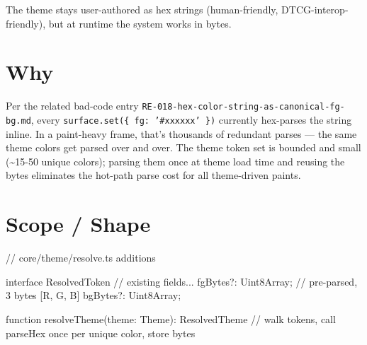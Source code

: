 The theme stays user-authored as hex strings (human-friendly, DTCG-interop-friendly), but at runtime the system works in bytes.

\section{Why}\label{record-369-why}

Per the related bad-code entry \texttt{R\allowbreak{}E\allowbreak{}-\allowbreak{}0\allowbreak{}1\allowbreak{}8\allowbreak{}-\allowbreak{}h\allowbreak{}e\allowbreak{}x\allowbreak{}-\allowbreak{}c\allowbreak{}o\allowbreak{}l\allowbreak{}o\allowbreak{}r\allowbreak{}-\allowbreak{}s\allowbreak{}t\allowbreak{}r\allowbreak{}i\allowbreak{}n\allowbreak{}g\allowbreak{}-\allowbreak{}a\allowbreak{}s\allowbreak{}-\allowbreak{}c\allowbreak{}a\allowbreak{}n\allowbreak{}o\allowbreak{}n\allowbreak{}i\allowbreak{}c\allowbreak{}a\allowbreak{}l\allowbreak{}-\allowbreak{}f\allowbreak{}g\allowbreak{}-\allowbreak{}b\allowbreak{}g\allowbreak{}.\allowbreak{}m\allowbreak{}d}, every \texttt{s\allowbreak{}u\allowbreak{}r\allowbreak{}f\allowbreak{}a\allowbreak{}c\allowbreak{}e\allowbreak{}.\allowbreak{}s\allowbreak{}e\allowbreak{}t\allowbreak{}(\allowbreak{}\{\allowbreak{} \allowbreak{}f\allowbreak{}g\allowbreak{}:\allowbreak{} \allowbreak{}'\allowbreak{}\#\allowbreak{}x\allowbreak{}x\allowbreak{}x\allowbreak{}x\allowbreak{}x\allowbreak{}x\allowbreak{}'\allowbreak{} \allowbreak{}\}\allowbreak{})} currently hex-parses the string inline. In a paint-heavy frame, that's thousands of redundant parses --- the same theme colors get parsed over and over. The theme token set is bounded and small (\textasciitilde15-50 unique colors); parsing them once at theme load time and reusing the bytes eliminates the hot-path parse cost for all theme-driven paints.

\section{Scope / Shape}\label{record-369-scope-shape}

\begin{CodeBlock}
// core/theme/resolve.ts additions

interface ResolvedToken {
  // existing fields...
  fgBytes?: Uint8Array;  // pre-parsed, 3 bytes [R, G, B]
  bgBytes?: Uint8Array;
}

function resolveTheme(theme: Theme): ResolvedTheme {
  // walk tokens, call parseHex once per unique color, store bytes
}
\end{CodeBlock}

